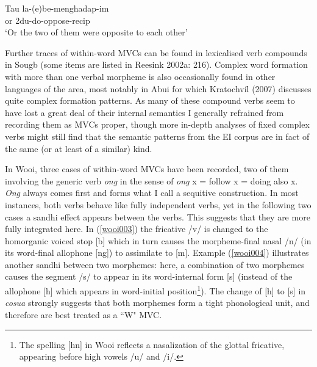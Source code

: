 \ea \label{sougb003}
\gll Tau la-(e)be-menghadap-im \\
or 2\acs{du}-do-oppose-\acs{recip} \\
\glft `Or the two of them were opposite to each other' \\ 
\z
\xe

Further traces of within-word MVCs can be found in lexicalised verb compounds in Sougb (some items are listed in Reesink 2002a: 216). Complex word formation with more than one verbal morpheme is also occasionally found in other languages of the area, most notably in Abui for which Kratochvíl (2007) discusses quite complex formation patterns. As many of these compound verbs seem to have lost a great deal of their internal semantics I generally refrained from recording them as MVCs proper, though more in-depth analyses of fixed complex verbs might still find that the semantic patterns from the EI corpus are in fact of the same (or at least of a similar) kind.

In Wooi, three cases of within-word MVCs have been recorded, two of them involving the generic verb \textit{ong} in the sense of \textit{ong} x = follow x = doing also x. \textit{Ong} always comes first and forms what I call a sequitive construction. In most instances, both verbs behave like fully independent verbs, yet in the following two cases a sandhi effect appears between the verbs. This suggests that they are more fully integrated here. In (\ref{wooi003}) the fricative /v/ is changed to the homorganic voiced stop [b] which in turn causes the morpheme-final nasal /n/ (in its word-final allophone [ng]) to assimilate to [m]. Example (\ref{wooi004}) illustrates another sandhi between two morphemes: here, a combination of two morphemes causes the segment /s/ to appear in its word-internal form [s] (instead of the allophone [h] which appears in word-initial position\footnote{The spelling [hn] in Wooi reflects a nasalization of the glottal fricative, appearing before high vowels /u/ and /i/.}). The change of [h] to [s] in \textit{cosua} strongly suggests that both morphemes form a tight phonological unit, and therefore are best treated as a ``W" MVC.

